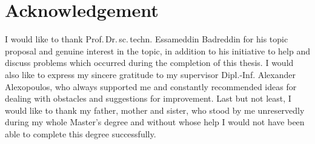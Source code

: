\section*{Acknowledgement}

I would like to thank Prof.\,Dr.\,sc.\,techn. Essameddin Badreddin for his topic proposal and genuine interest in the topic, in addition to his initiative to help and discuss problems which occurred during the completion of this thesis. I would also like to express my sincere gratitude to my supervisor Dipl.-Inf. Alexander Alexopoulos, who always supported me and constantly recommended ideas for dealing with obstacles and suggestions for improvement. Last but not least, I would like to thank my father, mother and sister, who stood by me unreservedly during my whole Master's degree and without whose help I would not have been able to complete this degree successfully.

